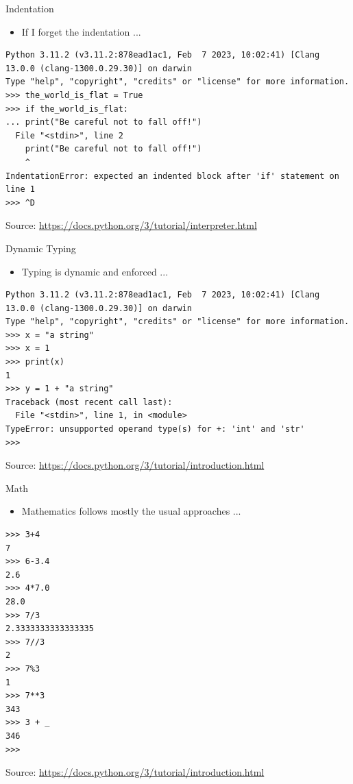 \documentclass{beamer}
\begin{document}
\begin{frame}[fragile]
{\centerline{Indentation}}
\begin{itemize}
    \item If I forget the indentation ...
\end{itemize} 
\begin{lstlisting}[style=myPythonStyle]
% python3.11
Python 3.11.2 (v3.11.2:878ead1ac1, Feb  7 2023, 10:02:41) [Clang 13.0.0 (clang-1300.0.29.30)] on darwin
Type "help", "copyright", "credits" or "license" for more information.
>>> the_world_is_flat = True
>>> if the_world_is_flat:
... print("Be careful not to fall off!")
  File "<stdin>", line 2
    print("Be careful not to fall off!")
    ^
IndentationError: expected an indented block after 'if' statement on line 1
>>> ^D
\end{lstlisting}
\begin{center}
\tiny Source: \url{https://docs.python.org/3/tutorial/interpreter.html}
\end{center}

\end{frame}

\begin{frame}[fragile]
{\centerline{Dynamic Typing}}
\begin{itemize}
    \item Typing is dynamic and enforced ...
\end{itemize} 
\begin{lstlisting}[style=myPythonStyle]
% python3.11
Python 3.11.2 (v3.11.2:878ead1ac1, Feb  7 2023, 10:02:41) [Clang 13.0.0 (clang-1300.0.29.30)] on darwin
Type "help", "copyright", "credits" or "license" for more information.
>>> x = "a string"
>>> x = 1
>>> print(x)
1
>>> y = 1 + "a string"
Traceback (most recent call last):
  File "<stdin>", line 1, in <module>
TypeError: unsupported operand type(s) for +: 'int' and 'str'
>>> 
\end{lstlisting}
\begin{center}
\tiny Source: \url{https://docs.python.org/3/tutorial/introduction.html}
\end{center}

\end{frame}

\begin{frame}[fragile]
{\centerline{Math}}
\begin{itemize}
    \item Mathematics follows mostly the usual approaches  ...
\end{itemize} 
\begin{lstlisting}[style=myPythonStyle]
% python3.11
>>> 3+4
7
>>> 6-3.4
2.6
>>> 4*7.0
28.0
>>> 7/3
2.3333333333333335
>>> 7//3
2
>>> 7%3
1
>>> 7**3
343
>>> 3 + _
346
>>>

\end{lstlisting}
\begin{center}
\tiny Source: \url{https://docs.python.org/3/tutorial/introduction.html}
\end{center}

\end{frame}
\end{document}
